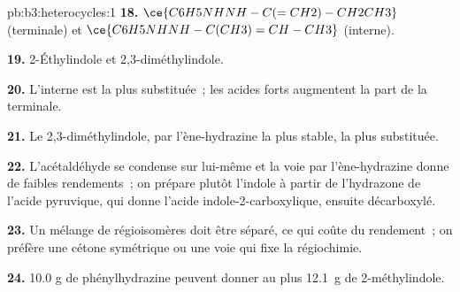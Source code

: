 \begin{solution}{pb:b3:heterocycles:1}
\textbf{18.} $\ce{C6H5NHNH-C(=CH2)-CH2CH3}$ (terminale) et $\ce{C6H5NHNH-C(CH3)=CH-CH3}$ (interne).

\textbf{19.} 2-Éthylindole et 2,3-diméthylindole.

\textbf{20.} L'interne est la plus substituée~; les acides forts augmentent
la part de la terminale.

\textbf{21.} Le 2,3-diméthylindole, par l'ène-hydrazine la plus stable, la
plus substituée.

\textbf{22.} L'acétaldéhyde se condense sur lui-même et la voie par
l'ène-hydrazine donne de faibles rendements~; on prépare plutôt l'indole à
partir de l'hydrazone de l'acide pyruvique, qui donne l'acide
indole-2-carboxylique, ensuite décarboxylé.

\textbf{23.} Un mélange de régioisomères doit être séparé, ce qui coûte du
rendement~; on préfère une cétone symétrique ou une voie qui fixe la
régiochimie.

\textbf{24.} 10.0 g de phénylhydrazine peuvent donner au plus \qty{12.1}{g} de 2-méthylindole.
\end{solution}
